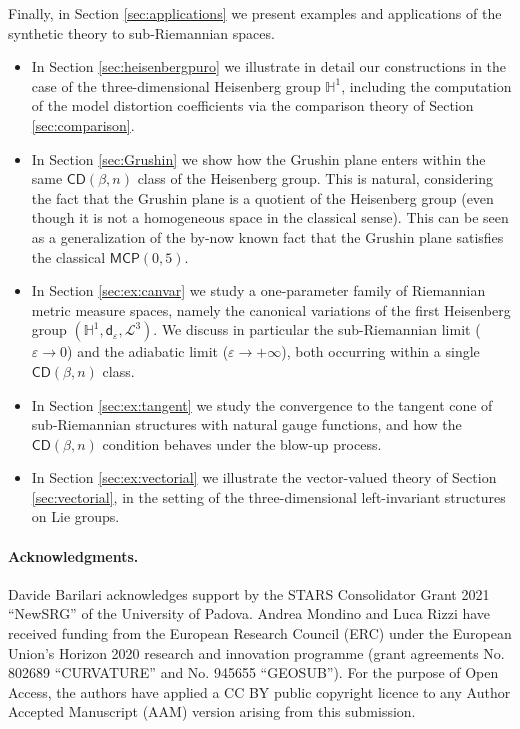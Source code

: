 \documentclass[11pt,a4paper]{article}
\theoremstyle{plain}
\theoremstyle{definition}
\theoremstyle{remark}
\numberwithin{equation}{section}
\renewcommand{\H}{\mathbb{H}}
\newcommand{\CD}{\mathsf{CD}}
\newcommand{\MCP}{\mathsf{MCP}}
\newcommand{\sfd}{\mathsf d}
\begin{document}
Finally, in Section \ref{sec:applications} we present examples and applications of the synthetic theory to sub-Riemannian spaces.
\begin{itemize}
\item In Section \ref{sec:heisenbergpuro} we illustrate in detail our constructions in the case of the three-dimensional Heisenberg group $\H^1$, including the computation of the model distortion coefficients via the comparison theory of Section \ref{sec:comparison}.
\item In Section \ref{sec:Grushin} we show how the Grushin plane enters within the same $\CD(\beta,n)$ class of the Heisenberg group. This is natural, considering the fact that the Grushin plane is a quotient of the Heisenberg group (even though it is not a homogeneous space in the classical sense). This can be seen as a generalization of the by-now known fact that the Grushin plane satisfies the classical $\MCP(0,5)$.
\item In Section \ref{sec:ex:canvar} we study a one-parameter family of Riemannian metric measure spaces, namely the canonical variations of the first Heisenberg group $(\H^{1},\sfd_\varepsilon,\mathscr{L}^{3})$. We discuss in particular the sub-Riemannian limit ($\varepsilon \to 0$) and the adiabatic limit ($\varepsilon \to +\infty$), both occurring within a single $\CD(\beta,n)$ class.
\item In Section \ref{sec:ex:tangent} we study the convergence to the tangent cone of sub-Riemannian structures with natural gauge functions, and how the $\CD(\beta,n)$ condition behaves under the blow-up process.
\item In Section \ref{sec:ex:vectorial} we illustrate the vector-valued theory of Section \ref{sec:vectorial}, in the setting of the three-dimensional left-invariant structures on Lie groups.
\end{itemize}
 

\paragraph{Acknowledgments.} Davide Barilari acknowledges support by the STARS Consolidator Grant 2021 ``NewSRG'' of the University of Padova. Andrea Mondino and Luca Rizzi have received funding from the European Research Council (ERC) under the European Union's Horizon 2020 research and innovation programme (grant agreements No. 802689 ``CURVATURE'' and No. 945655 ``GEOSUB'').  For the purpose of Open Access, the authors have applied a CC BY public copyright licence to any Author Accepted Manuscript (AAM) version arising from this submission.
\newpage
\end{document}
